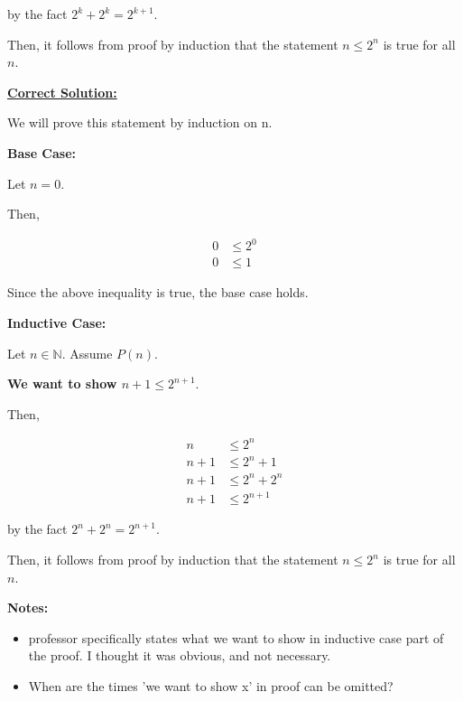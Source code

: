 \documentclass[12pt]{article}
\begin{document}
\begin{enumerate}[a.]
    by the fact $2^k + 2^k = 2^{k+1}$.

    \bigskip

    Then, it follows from proof by induction that the statement $n \leq 2^n$ is
    true for all $n$.

    \begin{mdframed}
        \underline{\textbf{Correct Solution:}}

        We will prove this statement by induction on n.

        \textbf{Base Case:}

        \bigskip

        Let $n = 0$.

        \bigskip

        Then,

        \begin{align}
            0 &\leq 2^0\\
            0 &\leq 1
        \end{align}

        \bigskip

        Since the above inequality is true, the base case holds.

        \bigskip

        \textbf{Inductive Case:}

        \bigskip

        Let $n \in \mathbb{N}$. Assume $P(n)$.

        \bigskip

        \textbf{We want to show $n+1 \leq 2^{n+1}$}.

        \bigskip

        Then,

        \begin{align}
            n &\leq 2^n\\
            n+1 &\leq 2^n + 1\\
            n+1 &\leq 2^n + 2^n\\
            n+1 &\leq 2^{n+1}
        \end{align}

        by the fact $2^n + 2^n = 2^{n+1}$.

        \bigskip

        Then, it follows from proof by induction that the statement $n \leq 2^n$ is
        true for all $n$.

    \end{mdframed}

    \bigskip

    \textbf{Notes:}
    \begin{itemize}
        \item professor specifically states what we want to show in inductive
        case part of the proof. I thought it was obvious, and not necessary.

        \item When are the times 'we want to show x' in proof can be omitted?

    \end{itemize}
\end{enumerate}
\end{document}
